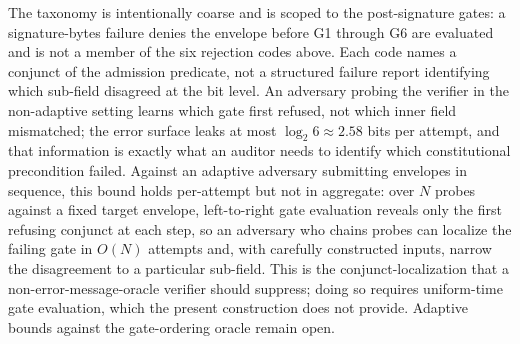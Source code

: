 The taxonomy is intentionally coarse and is scoped to the post-signature gates: a signature-bytes failure denies the envelope before G1 through G6 are evaluated and is not a member of the six rejection codes above. Each code names a conjunct of the admission predicate, not a structured failure report identifying which sub-field disagreed at the bit level. An adversary probing the verifier in the non-adaptive setting learns which gate first refused, not which inner field mismatched; the error surface leaks at most $\log_2 6 \approx 2.58$ bits per attempt, and that information is exactly what an auditor needs to identify which constitutional precondition failed. Against an adaptive adversary submitting envelopes in sequence, this bound holds per-attempt but not in aggregate: over $N$ probes against a fixed target envelope, left-to-right gate evaluation reveals only the first refusing conjunct at each step, so an adversary who chains probes can localize the failing gate in $O(N)$ attempts and, with carefully constructed inputs, narrow the disagreement to a particular sub-field. This is the conjunct-localization that a non-error-message-oracle verifier should suppress; doing so requires uniform-time gate evaluation, which the present construction does not provide. Adaptive bounds against the gate-ordering oracle remain open.
